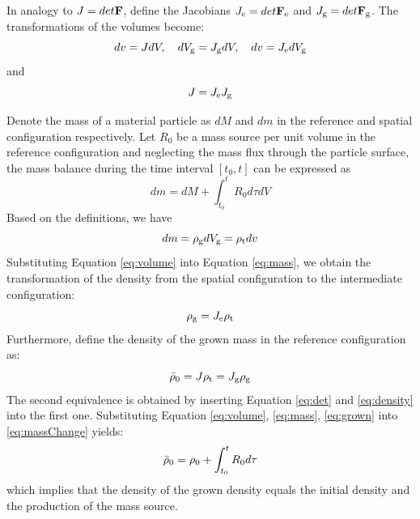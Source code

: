 In analogy to $J = det\bold{F}$, define the Jacobians $J_{\mathrm{e}} = det\bold{F}_\mathrm{e}$ and $J_{\mathrm{g}} = det\bold{F}_\mathrm{g}$. The transformations of the volumes become:
\begin{equation} \label{eq:volume}
dv = JdV, \quad dV_{\mathrm{g}} = J_{\mathrm{g}} dV, \quad dv = J_{\mathrm{e}} dV_{\mathrm{g}}
\end{equation}
and
\begin{equation} \label{eq:det}
J = J_{\mathrm{e}} J_{\mathrm{g}}
\end{equation}

Denote the mass of a material particle as $dM$ and $dm$ in the reference and spatial configuration respectively. Let $R_0$ be a mass source per unit volume in the reference configuration and neglecting the mass flux through the particle surface, the mass balance during the time interval $[t_0, t]$ can be expressed as
\begin{equation} \label{eq:massChange}
dm = dM + \int_{t_0}^t R_0 d\tau dV
\end{equation}
Based on the definitions, we have
\begin{equation} \label{eq:mass}
dm = \rho_{\mathrm{g}} dV_{\mathrm{g}} = \rho_{\mathrm{t}} dv
\end{equation}
Substituting Equation \ref{eq:volume} into Equation \ref{eq:mass}, we obtain the transformation of the density from the spatial configuration to the intermediate configuration:
\begin{equation} \label{eq:density}
\rho_{\mathrm{g}} = J_{\mathrm{e}}\rho_{\mathrm{t}}
\end{equation}
Furthermore, define the density of the grown mass in the reference configuration as:
\begin{equation} \label{eq:grown}
\bar{\rho}_0 = J\rho_{\mathrm{t}} = J_{\mathrm{g}} \rho_{\mathrm{g}}
\end{equation}
The second equivalence is obtained by inserting Equation \ref{eq:det} and \ref{eq:density} into the first one. Substituting Equation \ref{eq:volume}, \ref{eq:mass}, \ref{eq:grown} into \ref{eq:massChange} yields:
\begin{equation} \label{eq:rhoBalance}
\bar{\rho}_0 = \rho_0 + \int_{t_0}^t R_0 d\tau
\end{equation}
which implies that the density of the grown density equals the initial density and the production of the mass source.

